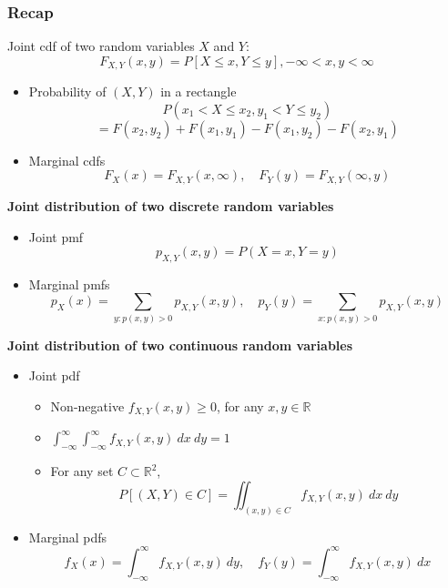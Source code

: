 \documentclass[slidestop,compress,mathserif]{beamer}
\begin{document}
\begin{frame}\frametitle{Recap}

Joint cdf of two random variables $X$ and $Y$:
\[ F_{X, Y}(x,y) = P[ X \leq x, Y \leq y ], -\infty < x, y < \infty \]
\begin{itemize}
\item Probability of $(X, Y)$ in a rectangle
\[P(x_1 < X \leq x_2, y_1 < Y \leq y_2)\]\[ = F(x_2, y_2) + F(x_1, y_1) - F(x_1, y_2) - F(x_2, y_1)\]
\item Marginal cdfs
\[ F_X(x) = F_{X, Y}(x, \infty), \quad F_Y(y) =  F_{X, Y}(\infty, y)\]
\end{itemize}

\end{frame}

\begin{frame}%

{\bf Joint distribution of two discrete random variables}
\begin{itemize}
\item Joint pmf
\[p_{X, Y}(x, y) = P(X=x,Y=y) \]
\item Marginal pmfs
\[p_X(x) = \sum_{y: p(x, y) > 0} p_{X, Y}(x,y), \quad p_Y(y) = \sum_{x: p(x, y) > 0} p_{X, Y}(x,y)  \]
\end{itemize}

\pause
{\bf Joint distribution of two continuous random variables }
\begin{itemize}
\item Joint pdf
  \begin{itemize}
  \item Non-negative $f_{X, Y}(x, y) \geq 0$, for any $x, y \in \mathbb{R}$
  \item $\int_{-\infty}^{\infty} \int_{-\infty}^{\infty} f_{X, Y}(x,y) ~dx~dy = 1$
  \item For any set $C \subset \mathbb{R}^2$,
  \[ P[(X, Y) \in C] = \iint_{(x, y) \in C} f_{X, Y}(x,y) ~dx~dy\]
  \end{itemize}
\item Marginal pdfs
\[ f_X(x) = \int_{-\infty}^\infty f_{X, Y}(x,y)~dy, \quad f_Y(y) = \int_{-\infty}^\infty f_{X, Y}(x,y)~dx \]
\end{itemize}


\end{frame}
\end{document}
